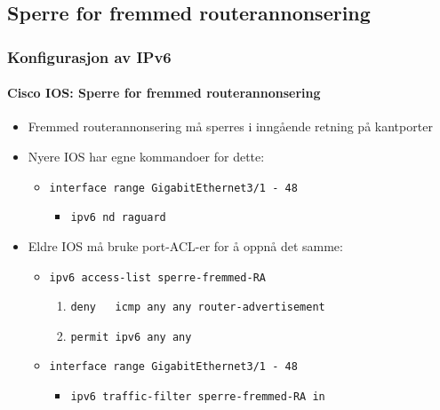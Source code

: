 \subsection{Sperre for fremmed routerannonsering}
\begin{frame}%
  \frametitle{Konfigurasjon av IPv6}
  \framesubtitle{Cisco IOS: Sperre for fremmed routerannonsering}
  \begin{itemize}%
  \item Fremmed routerannonsering må sperres i \alert{inngående} retning på
    \alert{kantporter}
  \item Nyere IOS har egne kommandoer for dette:
    \begin{itemize}%
    \item \texttt{interface range GigabitEthernet3/1 - 48}
      \begin{itemize}[<+->]
      \item \texttt{ipv6 nd raguard}
      \end{itemize}
    \end{itemize}
  \item Eldre IOS må bruke port-ACL-er for å oppnå det samme:
    \begin{itemize}%
    \item \texttt{ipv6 access-list sperre-fremmed-RA}
      \begin{enumerate}%
      \item \texttt{deny\ \ \ icmp any any router-advertisement}
      \item \texttt{permit    ipv6 any any}
      \end{enumerate}
    \item \texttt{interface range GigabitEthernet3/1 - 48}
      \begin{itemize}%
      \item \texttt{ipv6 traffic-filter sperre-fremmed-RA in}
      \end{itemize}
    \end{itemize}
  \end{itemize}
\end{frame}

